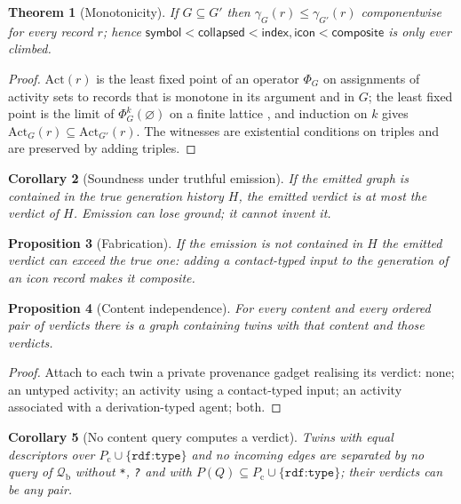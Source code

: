 \documentclass[11pt,twocolumn,a4paper]{article}
\theoremstyle{plain}
\newtheorem{theorem}{Theorem}[section]
\newtheorem{proposition}[theorem]{Proposition}
\newtheorem{corollary}[theorem]{Corollary}
\theoremstyle{definition}
\theoremstyle{remark}
\newcommand{\G}{G}
\newcommand{\Pc}{P_{\mathrm{c}}}
\newcommand{\Qfrag}{\mathcal{Q}_{\mathrm{b}}}
\newcommand{\Act}{\mathrm{Act}}
\newcommand{\gr}{\gamma}
\newcommand{\vsym}{\textsf{symbol}}
\newcommand{\vcol}{\textsf{collapsed}}
\newcommand{\vind}{\textsf{index}}
\newcommand{\vico}{\textsf{icon}}
\newcommand{\vcom}{\textsf{composite}}
\newcommand{\rdftype}{\texttt{rdf:type}}
\begin{document}
\begin{theorem}[Monotonicity]
\label{thm:monotone}
If $\G\subseteq\G'$ then $\gr_\G(r)\le\gr_{\G'}(r)$ componentwise for every
record $r$; hence $\vsym<\vcol<\vind,\vico<\vcom$ is only ever climbed.
\end{theorem}

\begin{proof}
$\Act(r)$ is the least fixed point of an operator $\Phi_\G$ on assignments of
activity sets to records that is monotone in its argument and in $\G$; the
least fixed point is the limit of $\Phi^k_\G(\varnothing)$ on a finite lattice
\citep{tarski1955}, and induction on $k$ gives
$\Act_\G(r)\subseteq\Act_{\G'}(r)$. The witnesses are existential conditions
on triples and are preserved by adding triples.
\end{proof}

\begin{corollary}[Soundness under truthful emission]
\label{cor:sound}
If the emitted graph is contained in the true generation history $H$, the
emitted verdict is at most the verdict of $H$. Emission can lose ground; it
cannot invent it.
\end{corollary}

\begin{proposition}[Fabrication]
\label{prop:fabricate}
If the emission is not contained in $H$ the emitted verdict can exceed the true
one: adding a contact-typed input to the generation of an \vico{} record makes it
\vcom.
\end{proposition}

\begin{proposition}[Content independence]
\label{prop:independent}
For every content and every ordered pair of verdicts there is a graph
containing twins with that content and those verdicts.
\end{proposition}

\begin{proof}
Attach to each twin a private provenance gadget realising its verdict: none;
an untyped activity; an activity using a contact-typed input; an activity
associated with a derivation-typed agent; both.
\end{proof}

\begin{corollary}[No content query computes a verdict]
\label{cor:notcontent}
Twins with equal descriptors over $\Pc\cup\{\rdftype\}$ and no incoming edges
are separated by no query of $\Qfrag$ without \texttt{*}, \texttt{?} and with
$P(Q)\subseteq\Pc\cup\{\rdftype\}$; their verdicts can be any pair.
\end{corollary}
\end{document}
